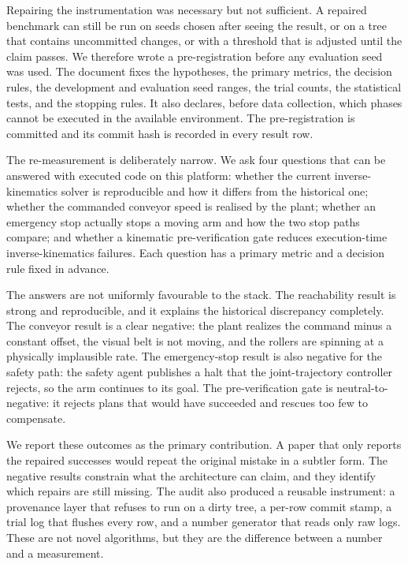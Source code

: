 \documentclass[journal]{IEEEtran}
\begin{document}
Repairing the instrumentation was necessary but not sufficient. A repaired benchmark can still be run on seeds chosen after seeing the result, or on a tree that contains uncommitted changes, or with a threshold that is adjusted until the claim passes. We therefore wrote a pre-registration before any evaluation seed was used. The document fixes the hypotheses, the primary metrics, the decision rules, the development and evaluation seed ranges, the trial counts, the statistical tests, and the stopping rules. It also declares, before data collection, which phases cannot be executed in the available environment. The pre-registration is committed and its commit hash is recorded in every result row.

The re-measurement is deliberately narrow. We ask four questions that can be answered with executed code on this platform: whether the current inverse-kinematics solver is reproducible and how it differs from the historical one; whether the commanded conveyor speed is realised by the plant; whether an emergency stop actually stops a moving arm and how the two stop paths compare; and whether a kinematic pre-verification gate reduces execution-time inverse-kinematics failures. Each question has a primary metric and a decision rule fixed in advance.

The answers are not uniformly favourable to the stack. The reachability result is strong and reproducible, and it explains the historical discrepancy completely. The conveyor result is a clear negative: the plant realizes the command minus a constant offset, the visual belt is not moving, and the rollers are spinning at a physically implausible rate. The emergency-stop result is also negative for the safety path: the safety agent publishes a halt that the joint-trajectory controller rejects, so the arm continues to its goal. The pre-verification gate is neutral-to-negative: it rejects plans that would have succeeded and rescues too few to compensate.

We report these outcomes as the primary contribution. A paper that only reports the repaired successes would repeat the original mistake in a subtler form. The negative results constrain what the architecture can claim, and they identify which repairs are still missing. The audit also produced a reusable instrument: a provenance layer that refuses to run on a dirty tree, a per-row commit stamp, a trial log that flushes every row, and a number generator that reads only raw logs. These are not novel algorithms, but they are the difference between a number and a measurement.
\end{document}

